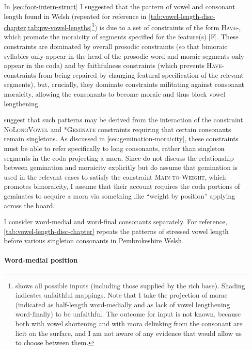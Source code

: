In \cref{sec:foot-intern-struct} I suggested that the pattern of vowel and consonant length found in Welsh (repeated for reference in \cref{tab:vowel-length-disc-chapter,tab:pw-vowel-lengths}\footnote{ shows all possible inputs (\ie including those supplied by the rich base). Shading indicates unfaithful mappings. Note that I take the projection of morae (indicated as half\hyp length word\hyp medially and as lack of vowel lengthening word\hyp finally) to be unfaithful. The outcome for input  is not known, because both \ipa{[Vn(ˑ)]} with vowel shortening and \ipa{[Vːn]} with mora delinking from the consonant are licit on the surface, and I am not aware of any evidence that would allow us to choose between them.}) is due to a set of constraints of the form \textsc{Have}-\mo[F], which promote the moraicity of segments specified for the feature(s) [F]. These constraints are dominated by overall prosodic constraints (so that bimoraic syllables only appear in the head of the prosodic word and moraic segments only appear in the coda) and by faithfulness constraints (which prevents \textsc{Have}-\mo[F] constraints from being repaired by changing featural specification of the relevant segments), but, crucially, they dominate constraints militating against consonant moraicity, allowing the consonants to become moraic and thus block vowel lengthening.

\citet{bye08} suggest that such patterns may be derived from the interaction of the constraint \textsc{NoLongVowel} and *\textsc{Geminate} constraints requiring that certain consonants remain singletons. As discussed in \cref{sec:gemination-moraicity}, these constraints must be able to refer specifically to long consonants, rather than singleton segments in the coda projecting a mora. Since \citet{bye08} do not discuss the relationship between gemination and moraicity explicitly \citep[\cfm][]{ringen11:_gemin} but do assume that gemination is used in the relevant cases to satisfy the constraint \textsc{Main\hyp to\hyp Weight}, which promotes bimoraicity, I assume that their account requires the coda portions of geminates to acquire a mora via something like \enquote{weight by position} applying across the board.

I consider word\hyp medial and word\hyp final consonants separately. For reference, \cref{tab:vowel-length-disc-chapter} repeats the patterns of stressed vowel length before various singleton consonants in Pembrokeshire Welsh.


\paragraph{Word-medial position}
\label{sec:word-medial-position}

